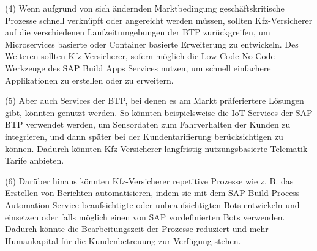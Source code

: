 (4) Wenn aufgrund von sich ändernden Marktbedingung geschäftskritische Prozesse schnell verknüpft oder angereicht werden müssen, sollten Kfz-Versicherer auf die verschiedenen Laufzeitumgebungen der BTP zurückgreifen, um Microservices basierte oder Container basierte Erweiterung zu entwickeln. Des Weiteren sollten Kfz-Versicherer, sofern möglich die Low-Code No-Code Werkzeuge des SAP Build Apps Services nutzen, um schnell einfachere Applikationen zu erstellen oder zu erweitern. 

(5) Aber auch Services der BTP, bei denen es am Markt präferiertere Lösungen gibt, könnten genutzt werden. So könnten beispielsweise die IoT Services der SAP BTP verwendet werden, um Sensordaten zum Fahrverhalten der Kunden zu integrieren, und dann später bei der Kundentarifierung berücksichtigen zu können. Dadurch könnten Kfz-Versicherer langfristig nutzungsbasierte Telematik-Tarife anbieten.

(6) Darüber hinaus könnten Kfz-Versicherer repetitive Prozesse wie z. B. das Erstellen von Berichten automatisieren, indem sie mit dem SAP Build Process Automation Service beaufsichtigte oder unbeaufsichtigten Bots entwickeln und einsetzen oder falls möglich einen von SAP vordefinierten Bots verwenden. Dadurch könnte die Bearbeitungszeit der Prozesse reduziert und mehr Humankapital für die Kundenbetreuung zur Verfügung stehen.


